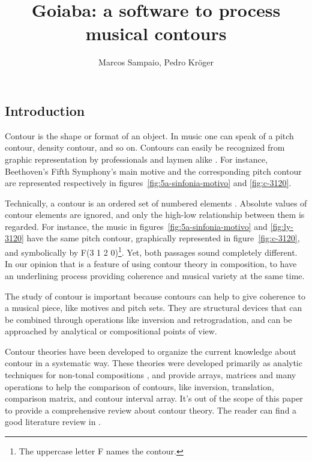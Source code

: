 \documentclass[a0paper]{sciposter}
\title{Goiaba: a software to process musical contours}
\author{Marcos Sampaio, Pedro Kröger}
\institute{Genos---Computer Music Research Group \\
Federal University of Bahia (UFBA) \\
Salvador, Brazil}
\begin{document}



\maketitle

\begin{multicols}{3}

\section{Introduction}

Contour is the shape or format of an object. In music one can speak of
a pitch contour, density contour, and so on. Contours can easily be
recognized from graphic representation by professionals and laymen
alike \cite{marvin88:generalized}. For instance, Beethoven's Fifth
Symphony's main motive and the corresponding pitch contour are
represented respectively in figures~\ref{fig:5a-sinfonia-motivo} and
\ref{fig:c-3120}.

Technically, a contour is an ordered set of numbered elements
\cite{morris93:directions}. Absolute values of contour elements are
ignored, and only the high-low relationship between them is regarded.
For instance, the music in figures~\ref{fig:5a-sinfonia-motivo} and
\ref{fig:ly-3120} have the same pitch contour, graphically represented
in figure~\ref{fig:c-3120}, and symbolically by F(3 1 2
0)\footnote{The uppercase letter F names the contour.}. Yet, both
passages sound completely different. In our opinion that is a feature
of using contour theory in composition, to have an underlining process
providing coherence and musical variety at the same time.

The study of contour is important because contours can help to give
coherence to a musical piece, like motives and pitch sets. They are
structural devices that can be combined through operations like
inversion and retrogradation, and can be approached by analytical or
compositional points of view.

Contour theories
\cite{friedmann85:methodology,morris87:composition,marvin88:generalized,beard03:contour}
have been developed to organize the current knowledge about contour in
a systematic way. These theories were developed primarily as analytic
techniques for non-tonal compositions \cite{beard03:contour}, and
provide arrays, matrices and many operations to help the comparison of
contours, like inversion, translation, comparison matrix, and contour
interval array. It's out of the scope of this paper to provide a
comprehensive review about contour theory. The reader can find a good
literature review in \cite{beard03:contour}.


\end{multicols}
\end{document}
